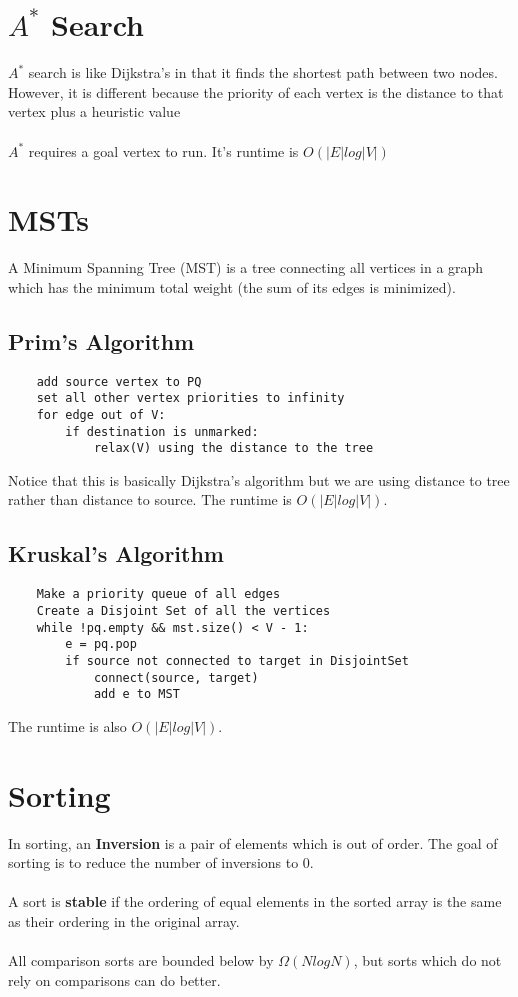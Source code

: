 \documentclass{article}
\begin{document}
\section{$A^*$ Search}
$A^*$ search is like Dijkstra's in that it finds the shortest path between two nodes.
However, it is different because the priority of each vertex is the distance to that vertex plus a heuristic value
\\\\
$A^*$ requires a goal vertex to run. It's runtime is $O(|E|log|V|)$
\section{MSTs}
A Minimum Spanning Tree (MST) is a tree connecting all vertices in a graph which has the minimum total weight (the sum of its edges is minimized).
\subsection{Prim's Algorithm}
\begin{lstlisting}
    add source vertex to PQ
    set all other vertex priorities to infinity
    for edge out of V:
        if destination is unmarked:
            relax(V) using the distance to the tree
\end{lstlisting}
Notice that this is basically Dijkstra's algorithm but we are using distance to tree rather than distance to source.
The runtime is $O(|E|log|V|)$.
\subsection{Kruskal's Algorithm}
\begin{lstlisting}
    Make a priority queue of all edges
    Create a Disjoint Set of all the vertices
    while !pq.empty && mst.size() < V - 1:
        e = pq.pop
        if source not connected to target in DisjointSet
            connect(source, target)
            add e to MST
\end{lstlisting}
The runtime is also $O(|E|log|V|)$.
\section{Sorting}
In sorting, an \textbf{Inversion} is a pair of elements which is out of order.
The goal of sorting is to reduce the number of inversions to 0.\\\\
A sort is \textbf{stable} if the ordering of equal elements in the sorted array is the same as their ordering in the original array.
\\\\
All comparison sorts are bounded below by $\Omega(NlogN)$, but sorts which do not rely on comparisons can do better.
\end{document}
